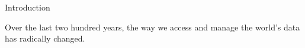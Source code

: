 \begin{section}{Introduction}

Over the last two hundred years, the way we access and manage the world's data has radically changed.

\end{section}
